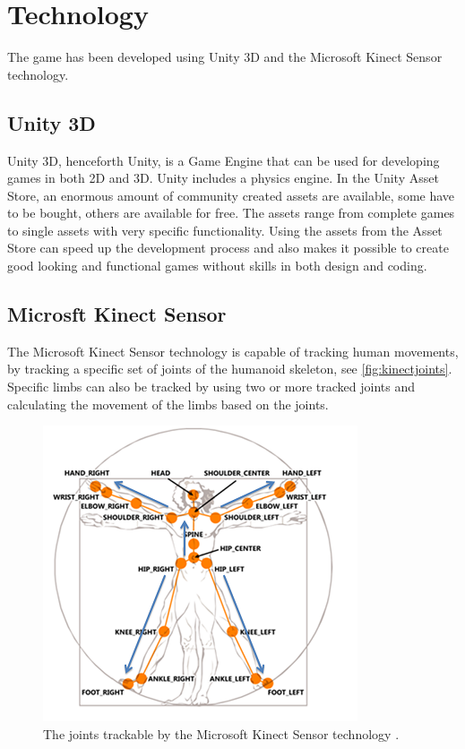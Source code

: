 \documentclass[11pt]{report}
\begin{document}
\section{Technology}
The game has been developed using Unity 3D and the Microsoft Kinect Sensor technology.

\subsection{Unity 3D}
Unity 3D, henceforth Unity, is a Game Engine that can be used for developing games in both 2D and 3D. Unity includes a physics engine. In the Unity Asset Store, an enormous amount of community created assets are available, some have to be bought, others are available for free. The assets range from complete games to single assets with very specific functionality. Using the assets from the Asset Store can speed up the development process and also makes it possible to create good looking and functional games without skills in both design and coding.

\subsection{Microsft Kinect Sensor}
The Microsoft Kinect Sensor technology is capable of tracking human movements, by tracking a specific set of joints of the humanoid skeleton, see \autoref{fig:kinectjoints}. Specific limbs can also be tracked by using two or more tracked joints and calculating the movement of the limbs based on the joints.

\begin{figure}[H]
\centering
\includegraphics{../GFX/joints.png}
\caption[Joints trackable by the Microsoft Kinect Sensor technology]{The joints trackable by the Microsoft Kinect Sensor technology \cite{kinectjoints}\cite{kinectusertracking}.}
\label{fig:kinectjoints}
\end{figure}
\end{document}
